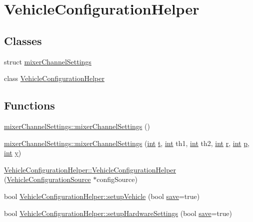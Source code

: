 \hypertarget{group___vehicle_configuration_helper}{\section{Vehicle\-Configuration\-Helper}
\label{group___vehicle_configuration_helper}
}
\subsection*{Classes}
\begin{DoxyCompactItemize}
\item 
struct \hyperlink{structmixer_channel_settings}{mixer\-Channel\-Settings}
\item 
class \hyperlink{class_vehicle_configuration_helper}{Vehicle\-Configuration\-Helper}
\end{DoxyCompactItemize}
\subsection*{Functions}
\begin{DoxyCompactItemize}
\item 
\hyperlink{group___vehicle_configuration_helper_gad16199c03ec2dcfd31a6930c77e6a073}{mixer\-Channel\-Settings\-::mixer\-Channel\-Settings} ()
\item 
\hyperlink{group___vehicle_configuration_helper_ga7dfd912206868944ab15d6bf785e2325}{mixer\-Channel\-Settings\-::mixer\-Channel\-Settings} (\hyperlink{ioapi_8h_a787fa3cf048117ba7123753c1e74fcd6}{int} \hyperlink{glext_8h_a00140d6f5c548b26daf170bf16e86a6d}{t}, \hyperlink{ioapi_8h_a787fa3cf048117ba7123753c1e74fcd6}{int} th1, \hyperlink{ioapi_8h_a787fa3cf048117ba7123753c1e74fcd6}{int} th2, \hyperlink{ioapi_8h_a787fa3cf048117ba7123753c1e74fcd6}{int} \hyperlink{glext_8h_abe08814c2f72843fde4d8df41440d5a0}{r}, \hyperlink{ioapi_8h_a787fa3cf048117ba7123753c1e74fcd6}{int} \hyperlink{glext_8h_aa5367c14d90f462230c2611b81b41d23}{p}, \hyperlink{ioapi_8h_a787fa3cf048117ba7123753c1e74fcd6}{int} \hyperlink{glext_8h_a42315f3ed8fff752bb47fd782309fcfc}{y})
\item 
\hyperlink{group___vehicle_configuration_helper_ga8d0681e69a65e5d227b2255abe8bb982}{Vehicle\-Configuration\-Helper\-::\-Vehicle\-Configuration\-Helper} (\hyperlink{class_vehicle_configuration_source}{Vehicle\-Configuration\-Source} $\ast$config\-Source)
\item 
bool \hyperlink{group___vehicle_configuration_helper_gaa307534a6b38e5b7e67060bc8d381b09}{Vehicle\-Configuration\-Helper\-::setup\-Vehicle} (bool \hyperlink{uavobjecttemplate_8m_a79178933c5b76091ca04178d14a5ba98}{save}=true)
\item 
bool \hyperlink{group___vehicle_configuration_helper_ga2762da9776a1c2608786cb7b1ff6ca6c}{Vehicle\-Configuration\-Helper\-::setup\-Hardware\-Settings} (bool \hyperlink{uavobjecttemplate_8m_a79178933c5b76091ca04178d14a5ba98}{save}=true)
\end{DoxyCompactItemize}
